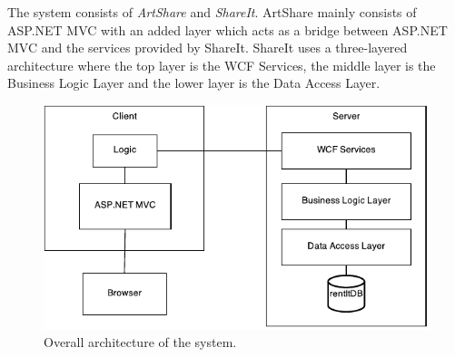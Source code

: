 \documentclass[../report.tex]{subfiles}
\begin{document}
\graphicspath{{img/}{../img/}}

The system consists of \textit{ArtShare} and \textit{ShareIt}. ArtShare mainly consists of ASP.NET MVC with an added layer which acts as a bridge between ASP.NET MVC and the services provided by ShareIt. ShareIt uses a three-layered architecture where the top layer is the WCF Services, the middle layer is the Business Logic Layer and the lower layer is the Data Access Layer. 
\begin{figure}[H]
\centering
\includegraphics{overall_architecture.pdf}
\caption{Overall architecture of the system.}
\end{figure}
\end{document}
